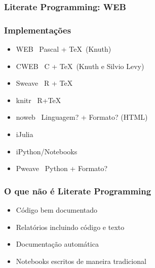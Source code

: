 \documentclass{beamer}
\begin{document}
\begin{frame}[fragile]
  \frametitle{Literate Programming: WEB}
  \begin{center}
  \end{center}

  \begin{center}
    \href{https://github.com/zyedidia/Literate/blob/master/examples/wc.lit}{}
  \end{center}
\end{frame}

\begin{frame}
  \frametitle{Implementações}
  \begin{itemize}
  \item WEB \textemdash\ Pascal + \TeX\ (Knuth) 
  \item CWEB \textemdash\ C + \TeX\ (Knuth e Silvio Levy)
  \item Sweave \textemdash\ R + \TeX
  \item knitr \textemdash\ R+\TeX
  \item noweb \textemdash\ Linguagem? + Formato? (HTML)
  \item iJulia
  \item iPython/Notebooks
  \item \alert{Pweave} \textemdash\ Python + Formato?
  \end{itemize}
\end{frame}

\begin{frame}
  \frametitle{O que não é Literate Programming}
  \begin{itemize}
  \item Código bem documentado
  \item Relatórios incluindo código e texto 
  \item Documentação automática
  \item Notebooks escritos de maneira tradicional
  \end{itemize}
\end{frame}
\end{document}
